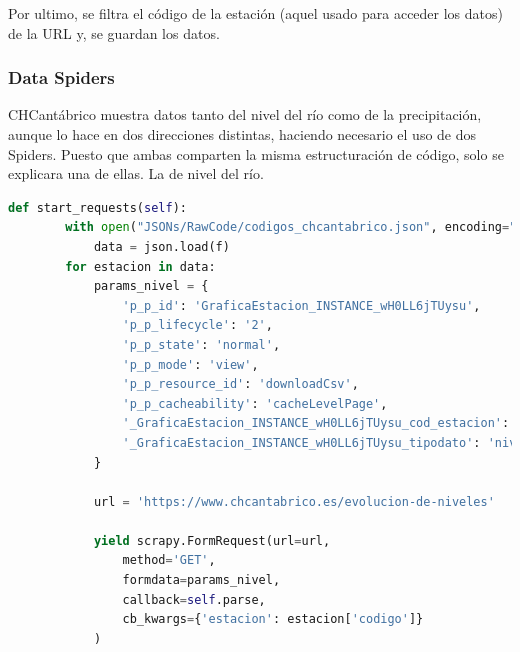 Por ultimo, se filtra el código de la estación (aquel usado para acceder los datos) de la URL y, se guardan los datos.

\subsubsection{Data Spiders}
CHCantábrico muestra datos tanto del nivel del río como de la precipitación, aunque lo hace en dos direcciones distintas, haciendo necesario el uso de dos Spiders.\newline
\newline
Puesto que ambas comparten la misma estructuración de código, solo se explicara una de ellas. La de nivel del río.

\begin{lstlisting}[language=Python, caption={Función \textit{start\_requests()} CHCantábrico Nivel Spider}]
	def start_requests(self):
		with open("JSONs/RawCode/codigos_chcantabrico.json", encoding="utf-8") as f:
			data = json.load(f)
		for estacion in data:
			params_nivel = {
				'p_p_id': 'GraficaEstacion_INSTANCE_wH0LL6jTUysu',
				'p_p_lifecycle': '2',
				'p_p_state': 'normal',
				'p_p_mode': 'view',
				'p_p_resource_id': 'downloadCsv',
				'p_p_cacheability': 'cacheLevelPage',
				'_GraficaEstacion_INSTANCE_wH0LL6jTUysu_cod_estacion': f'{estacion["codigo"]}',
				'_GraficaEstacion_INSTANCE_wH0LL6jTUysu_tipodato': 'nivel',
			}
		
			url = 'https://www.chcantabrico.es/evolucion-de-niveles'
			
			yield scrapy.FormRequest(url=url,
				method='GET',
				formdata=params_nivel,
				callback=self.parse,
				cb_kwargs={'estacion': estacion['codigo']}
			)
\end{lstlisting}

